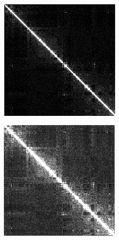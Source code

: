 \documentclass{article}
\begin{document}
\begin{figure}[H]
\begin{subfigure}[b]{.3\textwidth}
        \caption{}
        \label{fig:pearson}
    \end{subfigure}
    \begin{subfigure}[b]{.3\textwidth}
        \includegraphics[width=\textwidth]{figures/scn.png}
        \caption{}
        \label{fig:scn}
    \end{subfigure}
    \begin{subfigure}[b]{.3\textwidth}
        \includegraphics[width=\textwidth]{figures/scn+pearson.png}

\end{subfigure}
\end{figure}
\end{document}
